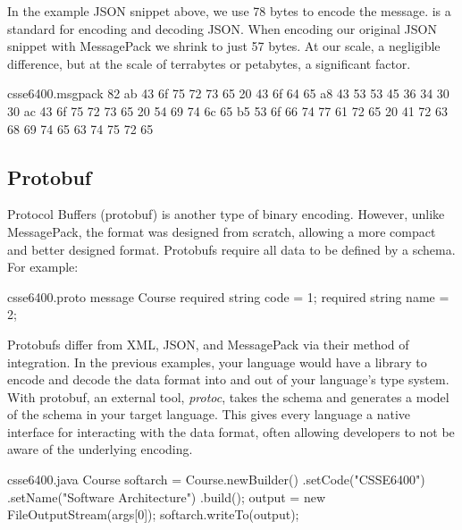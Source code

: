 \documentclass{csse4400}
\begin{document}
In the example JSON snippet above, we use 78 bytes to encode the message.
 is a standard for encoding and decoding JSON.
When encoding our original JSON snippet with MessagePack we shrink to just 57 bytes.
At our scale, a negligible difference,
but at the scale of terrabytes or petabytes,
a significant factor.

\begin{code}[]{csse6400.msgpack}
82 ab 43 6f 75 72 73 65 20 43 6f 64 65 a8 43 53 53 45 36 34 30 30 ac 43 6f 75 72 73 65 20 54 69 74 6c 65 b5 53 6f 66 74 77 61 72 65 20 41 72 63 68 69 74 65 63 74 75 72 65
\end{code}


\subsection{Protobuf}
Protocol Buffers (protobuf) is another type of binary encoding.
However, unlike MessagePack, the format was designed from scratch,
allowing a more compact and better designed format.
Protobufs require all data to be defined by a schema.
For example:

\begin{code}[language=protobuf]{csse6400.proto}
message Course {
    required string code = 1;
    required string name = 2;
}
\end{code}

Protobufs differ from XML, JSON, and MessagePack via their method of integration.
In the previous examples,
your language would have a library to encode and decode the data format into and out of your language's type system.
With protobuf, an external tool, \textsl{protoc},
takes the schema and generates a model of the schema in your target language.
This gives every language a native interface for interacting with the data format,
often allowing developers to not be aware of the underlying encoding.


\begin{code}[language=java]{csse6400.java}
Course softarch = Course.newBuilder()
    .setCode("CSSE6400")
    .setName("Software Architecture")
    .build();
output = new FileOutputStream(args[0]);
softarch.writeTo(output);
\end{code}
\end{document}

